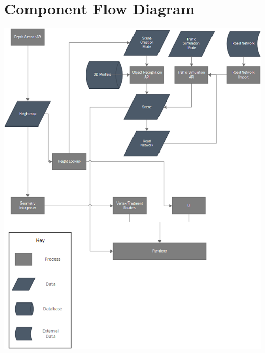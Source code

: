 \documentclass[letterpaper, 10pt, onecolumn, draftclsnofoot]{IEEEtran}
\begin{document}
    \section{Component Flow Diagram}
    \label{ComponentFlowDiagram}
        \begin{center}
        \includegraphics{ComponentFlowDiagram.png}
        \end{center}

\newpage
\nocite{*}


        
\end{document}
